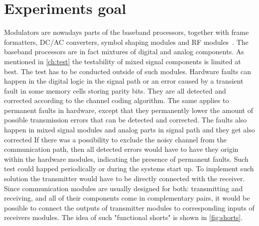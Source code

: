 \section{Experiments goal}
Modulators are nowadays parts of the baseband processors, together with frame formatters, DC/AC converters, symbol shaping modules and RF modules~\cite{book:Ismail}. The baseband processors are in fact mixtures of digital and analog components. As mentioned in \autoref{ch:test} the testability of mixed signal components is limited at best. The test has to be conducted outside of such modules.
Hardware faults can happen in the digital logic in the signal path or an error caused by a transient fault in some memory cells storing parity bits. They are all detected and corrected according to the channel coding algorithm. The same applies to permanent faults in hardware, except that they permanently lower the amount of possible transmission errors that can be detected and corrected. The faults also happen in mixed signal modules and analog parts in signal path and they get also corrected 
If there was a possibility to exclude the noisy channel from the communication path, then all detected errors would have to have they origin within the hardware modules, indicating the presence of permanent faults. Such test could happed periodically or during the systems start up.
To implement such solution the transmitter would have to be directly connected with the receiver. Since communication modules are usually designed for both: transmitting and receiving, and all of their components come in complementary pairs, it would be possible to connect the outputs of transmitter modules to corresponding inputs of receivers modules. The idea of such "functional shorts" is shown in \autoref{fig:shorts}.

\section{}
